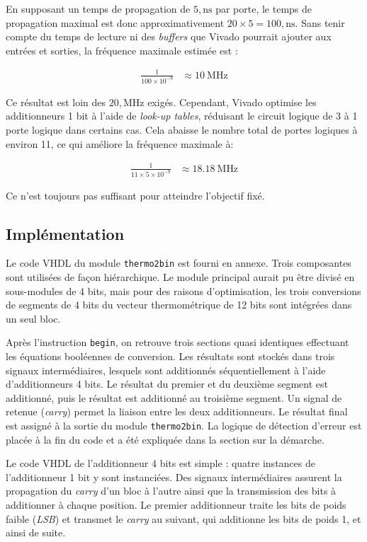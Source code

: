 \documentclass[a11paper]{article}
\begin{document}
En supposant un temps de propagation de $5,\text{ns}$ par porte, le temps de
propagation maximal est donc approximativement $20 \times 5 = 100,\text{ns}$.
Sans tenir compte du temps de lecture ni des \textit{buffers} que Vivado
pourrait ajouter aux entrées et sorties, la fréquence maximale estimée est :

\begin{align}
	\frac{1}{100 \times 10^{-9}} & \approx \SI{10}{\mega\hertz}
\end{align}

Ce résultat est loin des $20,\text{MHz}$ exigés. Cependant, Vivado optimise
les additionneurs 1 bit à l’aide de \textit{look-up tables}, réduisant le
circuit logique de 3 à 1 porte logique dans certains cas. Cela abaisse le
nombre total de portes logiques à environ 11, ce qui améliore la fréquence
maximale à:

\begin{align}
	\frac{1}{11 \times 5 \times 10^{-9}} & \approx \SI{18.18}{\mega\hertz}
\end{align}

Ce n’est toujours pas suffisant pour atteindre l’objectif fixé.

\subsection{Implémentation}

Le code VHDL du module \texttt{thermo2bin} est fourni en annexe. Trois
composantes sont utilisées de façon hiérarchique. Le module principal aurait
pu être divisé en sous-modules de 4 bits, mais pour des raisons
d’optimisation, les trois conversions de segments de 4 bits du vecteur
thermométrique de 12 bits sont intégrées dans un seul bloc.

Après l’instruction \texttt{begin}, on retrouve trois sections quasi
identiques effectuant les équations booléennes de conversion. Les résultats
sont stockés dans trois signaux intermédiaires, lesquels sont additionnés
séquentiellement à l’aide d’additionneurs 4 bits. Le résultat du premier et
du deuxième segment est additionné, puis le résultat est additionné au
troisième segment. Un signal de retenue (\textit{carry}) permet la liaison
entre les deux additionneurs. Le résultat final est assigné à la sortie du
module \texttt{thermo2bin}. La logique de détection d’erreur est placée à la
fin du code et a été expliquée dans la section sur la démarche.

Le code VHDL de l’additionneur 4 bits est simple : quatre instances de
l’additionneur 1 bit y sont instanciées. Des signaux intermédiaires assurent
la propagation du \textit{carry} d’un bloc à l’autre ainsi que la
transmission des bits à additionner à chaque position. Le premier
additionneur traite les bits de poids faible (\textit{LSB}) et transmet le
\textit{carry} au suivant, qui additionne les bits de poids 1, et ainsi de
suite.
\end{document}
